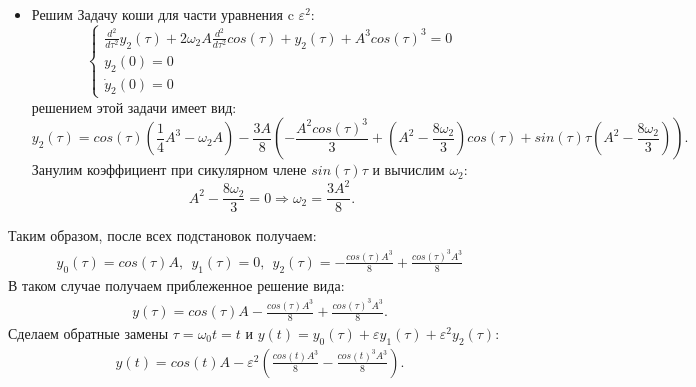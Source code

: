 \documentclass[12pt]{article}
\begin{document}
\begin{itemize}
\begin{itemize}
            \item Решим Задачу коши для части уравнения c $\varepsilon^2$:
            \begin{equation*}
                \begin{cases}
                    \frac{d^2}{d\tau^2}y_2(\tau) + 2\omega_2A\frac{d^2}{d\tau^2}cos(\tau) + y_2(\tau) + A^3cos(\tau)^3 = 0 \\
                    y_2(0)=0\\
                    \dot y_2(0)=0
                \end{cases}
            \end{equation*}
            решением этой задачи имеет вид: $$y_2(\tau) = cos(\tau)\left(\frac{1}{4}A^3 - \omega_2A\right) - 
            \frac{3A}{8}\left(-\frac{A^2cos(\tau)^3}{3} + \left(A^2 - \frac{8\omega_2}{3}\right)cos(\tau) + 
            sin(\tau)\tau\left(A^2 - \frac{8\omega_2}{3}\right)\right).$$
            Занулим коэффициент при сикулярном члене $sin(\tau)\tau$ и вычислим $\omega_2$:
            $$A^2 - \frac{8\omega_2}{3}=0 \Rightarrow \omega_2=\frac{3A^2}{8}.$$
        \end{itemize}
        Таким образом, после всех подстановок получаем:
        \begin{eqnarray}
            y_0(\tau)=cos(\tau)A,\:\:y_1(\tau)=0,\:\:y_2(\tau)=-\frac{cos(\tau)A^3}{8} + \frac{cos(\tau)^3A^3}{8}
        \end{eqnarray}
        В таком случае получаем приблеженное решение вида:
        \begin{eqnarray}
            y(\tau)=cos(\tau)A-\frac{cos(\tau)A^3}{8} + \frac{cos(\tau)^3A^3}{8}.
        \end{eqnarray}
        Сделаем обратные замены $\tau=\omega_0t=t$ и $y(t)=y_0(\tau)+\varepsilon y_1(\tau)+\varepsilon^2y_2(\tau)$:
        \begin{eqnarray}
            y(t)=cos(t)A-\varepsilon^2\left(\frac{cos(t)A^3}{8} - \frac{cos(t)^3A^3}{8}\right).
        \end{eqnarray}
        \newpage


\end{itemize}
\end{document}
